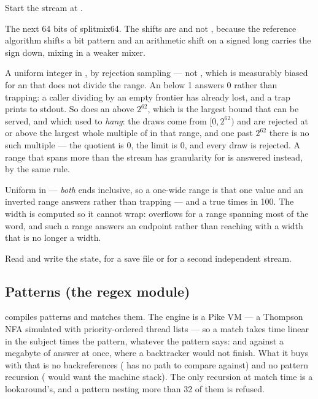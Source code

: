 \begin{description}[style=nextline,leftmargin=5.2em]
\item[\ic{random.seed(v)}] Start the stream at .
\item[\ic{random.next()}] The next 64 bits of splitmix64. The shifts are
  \ic{>>>} and not \ic{>>}, because the reference algorithm shifts a bit pattern
  and an arithmetic shift on a signed long carries the sign down, mixing in a
  weaker mixer.
\item[\ic{random.below(n)}] A uniform integer in , by rejection
  sampling --- not , which is measurably biased for an  that does
  not divide the range. An  below 1 answers 0 rather than trapping: a
  caller dividing by an empty frontier has already lost, and a trap prints to
  stdout. So does an  above $2^{62}$, which is the largest bound that can
  be served, and which used to \emph{hang}: the draws come from $[0, 2^{62})$
  and are rejected at or above the largest whole multiple of  in that
  range, and one past $2^{62}$ there is no such multiple --- the quotient is 0,
  the limit is 0, and every draw is rejected. A range that spans more than the
  stream has granularity for is answered  instead, by the same rule.
\item[\ic{random.range(lo, hi)}] Uniform in  --- \emph{both} ends
  inclusive, so a one-wide range is that one value and an inverted range
  answers  rather than trapping --- and
   a  true  times in 100. The width is
  computed so it cannot wrap:  overflows for a range spanning
  most of the word, and such a range answers an endpoint rather than reaching
   with a width that is no longer a width.
\item[\ic{random.state()}, \ic{random.set\_state(v)}] Read and write the state,
  for a save file or for a second independent stream.
\end{description}

\subsection{Patterns (the regex module)}
\label{sec:builtin-regex}

 compiles patterns and matches them. The engine is a Pike VM
--- a Thompson NFA simulated with priority-ordered thread lists --- so a match
takes time linear in the subject times the pattern, whatever the pattern says:
 and  against a megabyte of  answer at once, where
a backtracker would not finish. What it buys with that is no backreferences
( has no path to compare against) and no pattern recursion
( would want the machine stack). The only recursion at match time is a
lookaround's, and a pattern nesting more than 32 of them is refused.

